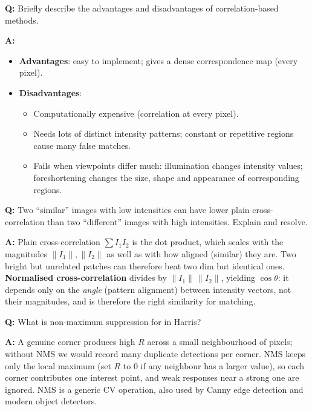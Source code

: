 \begin{exbox}
\textbf{Q:} Briefly describe the advantages and disadvantages of correlation-based methods.

\textbf{A:}
\begin{itemize}
  \item \textbf{Advantages}: easy to implement; gives a dense correspondence map (every pixel).
  \item \textbf{Disadvantages}:
  \begin{itemize}
    \item Computationally expensive (correlation at every pixel).
    \item Needs lots of distinct intensity patterns; constant or repetitive regions cause many false matches.
    \item Fails when viewpoints differ much: illumination changes intensity values; foreshortening changes the size, shape and appearance of corresponding regions.
  \end{itemize}
\end{itemize}
\end{exbox}

\begin{exbox}
\textbf{Q:} Two ``similar'' images with low intensities can have lower plain cross-correlation than two ``different'' images with high intensities. Explain and resolve.

\textbf{A:} Plain cross-correlation $\sum I_1 I_2$ is the dot product, which scales with the magnitudes $\|I_1\|, \|I_2\|$ as well as with how aligned (similar) they are. Two bright but unrelated patches can therefore beat two dim but identical ones. \textbf{Normalised cross-correlation} divides by $\|I_1\|\,\|I_2\|$, yielding $\cos\theta$: it depends only on the \emph{angle} (pattern alignment) between intensity vectors, not their magnitudes, and is therefore the right similarity for matching.
\end{exbox}

\begin{exbox}
\textbf{Q:} What is non-maximum suppression for in Harris?

\textbf{A:} A genuine corner produces high $R$ across a small neighbourhood of pixels; without NMS we would record many duplicate detections per corner. NMS keeps only the local maximum (set $R$ to 0 if any neighbour has a larger value), so each corner contributes one interest point, and weak responses near a strong one are ignored. NMS is a generic CV operation, also used by Canny edge detection and modern object detectors.
\end{exbox}

